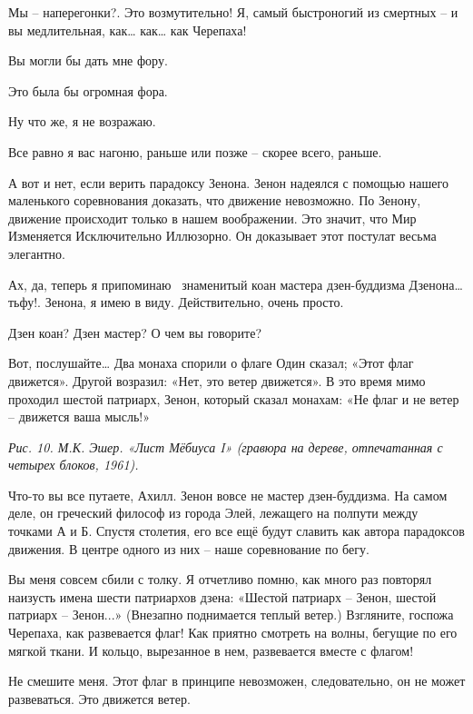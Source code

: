 \documentclass[../main.tex]{subfiles}
\begin{document}
\begin{Dialogue}
 Мы \--- наперегонки?. Это возмутительно! Я, самый быстроногий из смертных \--- и вы медлительная, как\ldots{} как\ldots{} как Черепаха!

 Вы могли бы дать мне фору.

 Это была бы огромная фора.

 Ну что же, я не возражаю.

 Все равно я вас нагоню, раньше или позже \--- скорее всего, раньше.

 А вот и нет, если верить парадоксу Зенона. Зенон надеялся с помощью нашего маленького соревнования доказать, что движение невозможно. По Зенону, движение происходит только в нашем воображении. Это значит, что Мир Изменяется Исключительно Иллюзорно. Он доказывает этот постулат весьма элегантно.

 Ах, да, теперь я припоминаю~ знаменитый коан мастера дзен-буддизма Дзенона\ldots{} тьфу!. Зенона, я имею в виду. Действительно, очень просто.

 Дзен коан? Дзен мастер? О чем вы говорите?

 Вот, послушайте\ldots{} Два монаха спорили о флаге Один сказал; «Этот флаг движется». Другой возразил: «Нет, это ветер движется». В это время мимо проходил шестой патриарх, Зенон, который сказал монахам: «Не флаг и не ветер \--- движется ваша мысль!»

\emph{Рис. 10. М.К. Эшер. «Лист Мёбиуса I» (гравюра на дереве, отпечатанная с четырех блоков, 1961).}

 Что-то вы все путаете, Ахилл. Зенон вовсе не мастер дзен-буддизма. На самом деле, он греческий философ из города Элей, лежащего на полпути между точками А и Б. Спустя столетия, его все ещё будут славить как автора парадоксов движения. В центре одного из них \--- наше соревнование по бегу.

 Вы меня совсем сбили с толку. Я отчетливо помню, как много раз повторял наизусть имена шести патриархов дзена: «Шестой патриарх \--- Зенон, шестой патриарх \--- Зенон...» (Внезапно поднимается теплый ветер.) Взгляните, госпожа Черепаха, как развевается флаг! Как приятно смотреть на волны, бегущие по его мягкой ткани. И кольцо, вырезанное в нем, развевается вместе с флагом!

 Не смешите меня. Этот флаг в принципе невозможен, следовательно, он не может развеваться. Это движется ветер.


\end{Dialogue}
\end{document}
